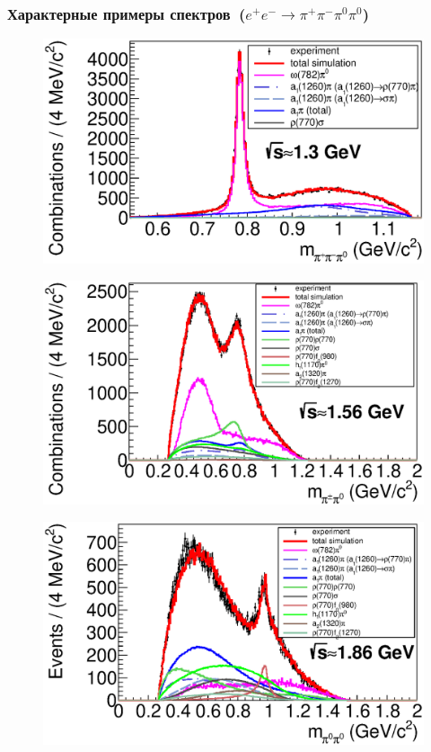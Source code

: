 \documentclass{beamer}
\begin{document}
\begin{frame}
  \frametitle{Характерные примеры спектров~($e^+e^-\to\pi^+\pi^-\pi^0\pi^0$)}
  \begin{minipage}[t]{0.49\linewidth}
    \begin{figure}
      \includegraphics[width=\linewidth]{figures/m_piplpimipi0_g650_2pi2pi0.eps}
    \end{figure}
  \end{minipage}
  \begin{minipage}[t]{0.49\linewidth}
    \begin{figure}
      \includegraphics[width=\linewidth]{figures/m_pipi0_g780_2pi2pi0.eps}
    \end{figure}
  \end{minipage}
  \begin{minipage}[t]{0.49\linewidth}
    \begin{figure}
      \includegraphics[width=\linewidth]{figures/m_pi0pi0_g930_2pi2pi0.eps}

\end{figure}
\end{minipage}
\end{frame}
\end{document}

